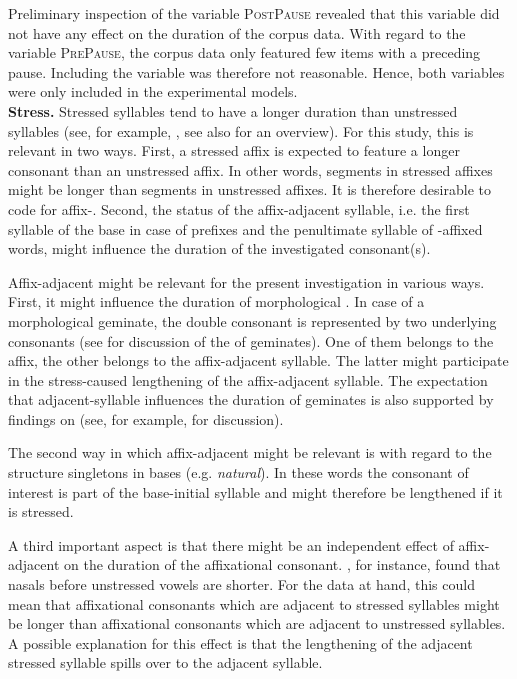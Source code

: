 Preliminary inspection of the variable \textsc{PostPause} revealed that this variable did not have any effect on the duration of the corpus data. With regard to the variable \textsc{PrePause}, the corpus data only featured few items with a preceding pause.  Including the variable was therefore not reasonable. Hence, both variables were only included in the experimental models. \\

\textbf{Stress.} \label{stress coding} Stressed syllables tend to have a longer duration than unstressed syllables (see, for example, \citealt{Fry.1955, Fry.1958, Lieberman.1960, Beckman.1986, Eriksson.2016}, see also \citealt{Laver.1994} for an overview). For this study, this is relevant in two ways.  First, a stressed affix is expected to feature a longer consonant than an unstressed affix. In other words, segments in stressed affixes might be longer than segments in unstressed affixes. It is therefore desirable to code for affix-.
Second, the  status of the affix-adjacent syllable, i.e. the first syllable of the base in case of prefixes and the penultimate syllable of -affixed words, might influence the duration of the investigated consonant(s). 

Affix-adjacent  might be relevant  for the present investigation in various ways. First, it might influence the duration of morphological . In case of a {morphological geminate}, the double consonant is represented by two underlying consonants (see  for discussion of the  of {geminates}). One of them belongs to the affix, the other belongs to the affix-adjacent syllable. The latter might participate in the stress-caused lengthening of the affix-adjacent syllable.  The expectation that adjacent-syllable  influences the duration of {geminates} is also supported by findings on  (see, for example, \citealt{Dmitrieva.2017} for discussion).

The second way in which affix-adjacent  might be relevant is with regard to the structure singletons in bases (e.g. \textit{natural}). In these words the consonant of interest is part of the base-initial syllable and might therefore be lengthened if it is stressed. 

A third important aspect is that there might be an independent effect of affix-adjacent  on the duration of the affixational consonant. \cite{Umeda.1977}, for instance, found that nasals before unstressed vowels are shorter. For the data at hand, this could mean that affixational consonants which are adjacent to stressed syllables might be longer than affixational consonants which are adjacent to unstressed syllables. A possible explanation for this effect is that the lengthening of the adjacent stressed syllable spills over to the adjacent syllable. 

